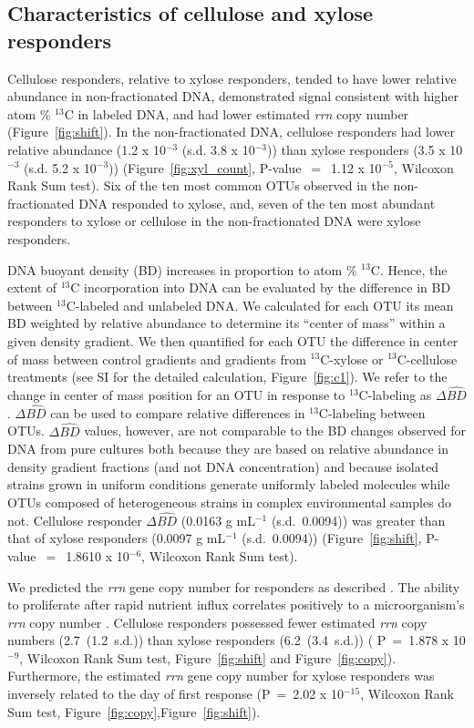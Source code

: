 \subsection{Characteristics of cellulose and xylose responders}
Cellulose responders, relative to xylose responders, tended to have lower
relative abundance in non-fractionated DNA, demonstrated signal consistent with
higher atom \% $^{13}$C in labeled DNA, and had lower estimated \textit{rrn}
copy number (Figure~\ref{fig:shift}). In the non-fractionated DNA, cellulose
responders had lower relative abundance (1.2 x 10$^{-3}$ (s.d. 3.8
x 10$^{-3}$)) than xylose responders (3.5 x 10$^{-3}$ (s.d. 5.2 x 10$^{-3}$))
(Figure~\ref{fig:xyl_count}, P-value~$=$~1.12 x 10$^{-5}$, Wilcoxon Rank Sum
test). Six of the ten most common OTUs observed in the non-fractionated DNA
responded to xylose, and, seven of the ten most abundant responders to xylose
or cellulose in the non-fractionated DNA were xylose responders.

DNA buoyant density (BD) increases in proportion to atom \% $^{13}$C.
Hence, the extent of $^{13}$C incorporation into DNA can be evaluated by
the difference in BD between $^{13}$C-labeled and unlabeled DNA. We
calculated for each OTU its mean BD weighted by relative abundance to
determine its ``center of mass'' within a given density gradient. We then
quantified for each OTU the difference in center of mass between control
gradients and gradients from $^{13}$C-xylose or $^{13}$C-cellulose treatments
(see SI for the detailed calculation, Figure~\ref{fig:c1}). We refer to the
change in center of mass position for an OTU in response to $^{13}$C-labeling
as $\Delta\hat{BD}$. $\Delta\hat{BD}$ can be used to compare relative
differences in $^{13}$C-labeling between OTUs. $\Delta\hat{BD}$ values,
however, are not comparable to the BD changes observed for DNA from pure
cultures both because they are  based on relative abundance in density gradient
fractions (and not DNA concentration) and because isolated strains grown in
uniform conditions generate uniformly labeled molecules while OTUs composed of
heterogeneous strains in complex environmental samples do not. Cellulose
responder $\Delta\hat{BD}$ (0.0163 g mL$^{-1}$ (s.d.~0.0094)) was greater than
that of xylose responders (0.0097 g mL$^{-1}$ (s.d.~0.0094))
(Figure~\ref{fig:shift}, P-value~$=$~1.8610 x 10$^{-6}$, Wilcoxon Rank Sum
test). 

We predicted the \textit{rrn} gene copy number for responders as described
\citep{Kembel_2012}. The ability to proliferate after rapid nutrient
influx correlates positively to a microorganism's \textit{rrn} copy number
\citep{Klappenbach_2000}. Cellulose responders possessed fewer estimated
\textit{rrn} copy numbers (2.7~(1.2~s.d.)) than xylose responders
(6.2~(3.4~s.d.)) ( P~=~1.878 x 10$^{-9}$, Wilcoxon Rank Sum test,
Figure~\ref{fig:shift} and Figure~\ref{fig:copy}). Furthermore, the
estimated \textit{rrn} gene copy number for xylose responders was
inversely related to the day of first response (P~=~2.02 x 10$^{-15}$,
Wilcoxon Rank Sum test, Figure~\ref{fig:copy},Figure~\ref{fig:shift}).

